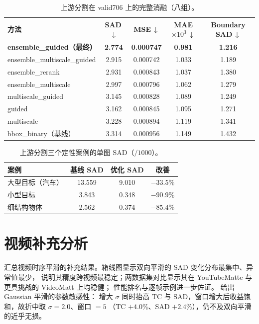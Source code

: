 \documentclass[final]{cvpr}
\begin{document}
\begin{table}[h]
\centering
\caption{上游分割在 valid706 上的完整消融（八组）。}
\label{tab:sam-full}
\setlength{\tabcolsep}{10pt}
\begin{tabular}{lcccc}
\toprule
方法 & SAD\,$\downarrow$ & MSE\,$\downarrow$ & MAE$\times10^3$\,$\downarrow$ & Boundary SAD\,$\downarrow$ \\
\midrule
\textbf{ensemble\_guided（最终）} & \textbf{2.774} & \textbf{0.000747} & \textbf{0.981} & \textbf{1.216} \\
ensemble\_multiscale\_guided & 2.915 & 0.000742 & 1.033 & 1.189 \\
ensemble\_rerank & 2.931 & 0.000843 & 1.037 & 1.380 \\
ensemble\_multiscale & 2.997 & 0.000796 & 1.062 & 1.279 \\
multiscale\_guided & 3.145 & 0.000828 & 1.089 & 1.249 \\
guided & 3.162 & 0.000845 & 1.095 & 1.271 \\
multiscale & 3.228 & 0.000894 & 1.119 & 1.341 \\
bbox\_binary（基线） & 3.314 & 0.000956 & 1.149 & 1.432 \\
\bottomrule
\end{tabular}
\end{table}

\begin{table}[h]
\centering
\caption{上游分割三个定性案例的单图 SAD（$/1000$）。}
\label{tab:sam-case}
\setlength{\tabcolsep}{14pt}
\begin{tabular}{lccc}
\toprule
案例 & 基线 SAD & 优化 SAD & 改善 \\
\midrule
大型目标（汽车） & 13.559 & 9.010 & $-33.5\%$ \\
小型目标 & 3.843 & 0.348 & $-90.9\%$ \\
细结构物体 & 2.562 & 0.374 & $-85.4\%$ \\
\bottomrule
\end{tabular}
\end{table}

\section{视频补充分析}
\label{sec:appendix-video}
 汇总视频时序平滑的补充结果。箱线图显示双向平滑的 SAD 变化分布最集中、异常值最少，
说明其精度跨视频最稳定；两数据集对比显示其在 YouTubeMatte 与更具挑战的 VideoMatt 上均稳健；
性能排名与逐帧示例进一步佐证。 给出 Gaussian 平滑的参数敏感性：
增大 $\sigma$ 同时抬高 TC 与 SAD，窗口增大后收益饱和，故折中取 $\sigma=2.0$、窗口 $=5$
（TC $+4.0\%$、SAD $+2.4\%$），仍不及双向平滑的近乎无损。
\end{document}
